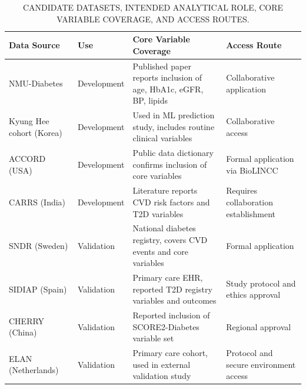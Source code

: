 \documentclass[conference]{IEEEtran}
\begin{document}
\begin{table}[t]
\caption{CANDIDATE DATASETS, INTENDED ANALYTICAL ROLE, CORE VARIABLE COVERAGE, AND ACCESS ROUTES.}
\label{tab:planned-datasets}
\centering
\begin{tabular}{l|l|l|l}
\textbf{Data Source}     & \textbf{Use} & \textbf{Core Variable Coverage}                                   & \textbf{Access Route}                         \\ \hline
NMU-Diabetes\cite{wan2022prediction}             & Development  & Published paper reports inclusion of age, HbA1c, eGFR, BP, lipids & Collaborative application                     \\
Kyung Hee cohort (Korea) \cite{sang2024prediction} & Development  & Used in ML prediction study, includes routine clinical variables  & Collaborative access                          \\
ACCORD (USA) \cite{action2008effects}             & Development  & Public data dictionary confirms inclusion of core variables       & Formal application via BioLINCC               \\
CARRS (India) \cite{kondal2022cohort}            & Development  & Literature reports CVD risk factors and T2D variables             & Requires collaboration establishment          \\
SNDR (Sweden) \cite{gudbjornsdottir2003national}            & Validation   & National diabetes registry, covers CVD events and core variables  & Formal application                            \\
SIDIAP (Spain) \cite{bolibar2012sidiap}          & Validation   & Primary care EHR, reported T2D registry variables and outcomes    & Study protocol and ethics approval            \\
CHERRY (China) \cite{lin2018using}          & Validation   & Reported inclusion of SCORE2-Diabetes variable set                & Regional approval \\
ELAN (Netherlands) \cite{alfaraj2025external}       & Validation   & Primary care cohort, used in external validation study            & Protocol and secure environment access       
\end{tabular}
\end{table}
\end{document}
